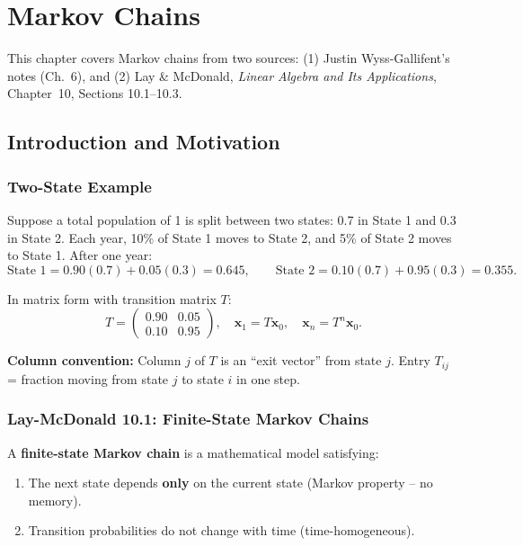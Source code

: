 \chapter{Markov Chains}

This chapter covers Markov chains from two sources:
(1) Justin Wyss-Gallifent's notes (Ch.~6), and
(2) Lay \& McDonald, \textit{Linear Algebra and Its Applications}, Chapter~10, Sections 10.1--10.3.

\section{Introduction and Motivation}

\subsection*{Two-State Example}

Suppose a total population of 1 is split between two states: 0.7 in State 1 and 0.3 in State 2. Each year, 10\% of State 1 moves to State 2, and 5\% of State 2 moves to State 1. After one year:
\[
  \text{State 1} = 0.90(0.7)+0.05(0.3)=0.645, \qquad
  \text{State 2} = 0.10(0.7)+0.95(0.3)=0.355.
\]

In matrix form with transition matrix $T$:
\[
  T=\begin{pmatrix}0.90&0.05\\0.10&0.95\end{pmatrix}, \quad
  \mathbf{x}_1 = T\mathbf{x}_0, \quad \mathbf{x}_n = T^n\mathbf{x}_0.
\]

\textbf{Column convention:} Column $j$ of $T$ is an ``exit vector'' from state $j$. Entry $T_{ij}$ = fraction moving from state $j$ to state $i$ in one step.

\subsection*{Lay-McDonald 10.1: Finite-State Markov Chains}

A \textbf{finite-state Markov chain} is a mathematical model satisfying:
\begin{enumerate}
  \item The next state depends \textbf{only} on the current state (Markov property -- no memory).
  \item Transition probabilities do not change with time (time-homogeneous).
\end{enumerate}

